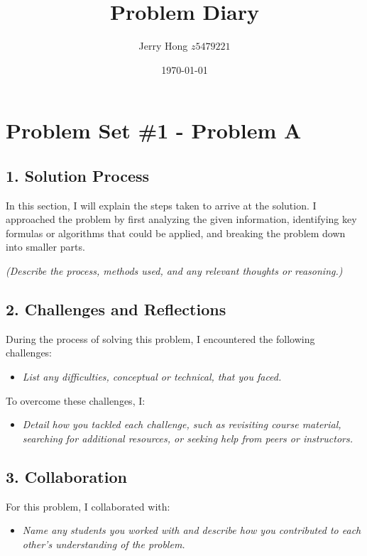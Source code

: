 \documentclass[a4paper,12pt]{article}
\title{Problem Diary}
\author{Jerry Hong $z5479221$}
\date{\today}
\begin{document}
\maketitle

\section*{Problem Set \#1 - Problem A}

\subsection*{1. Solution Process}
In this section, I will explain the steps taken to arrive at the solution. I approached the problem by first analyzing the given information, identifying key formulas or algorithms that could be applied, and breaking the problem down into smaller parts.

\textit{(Describe the process, methods used, and any relevant thoughts or reasoning.)}

\subsection*{2. Challenges and Reflections}
During the process of solving this problem, I encountered the following challenges:
\begin{itemize}
    \item \textit{List any difficulties, conceptual or technical, that you faced.}
\end{itemize}

To overcome these challenges, I:
\begin{itemize}
    \item \textit{Detail how you tackled each challenge, such as revisiting course material, searching for additional resources, or seeking help from peers or instructors.}
\end{itemize}

\subsection*{3. Collaboration}
For this problem, I collaborated with:
\begin{itemize}
    \item \textit{Name any students you worked with and describe how you contributed to each other's understanding of the problem.}
\end{itemize}
\end{document}

